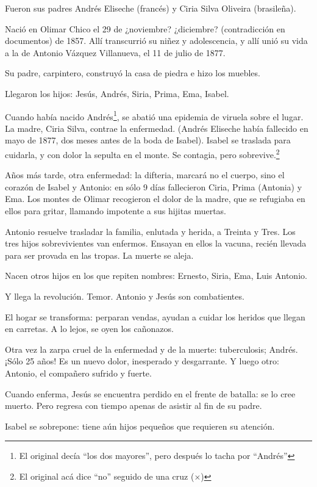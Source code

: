 \documentclass[a4paper]{article}
\begin{document}
Fueron sus padres Andrés Eliseche (francés) y Ciria Silva Oliveira (brasileña).

Nació en Olimar Chico el 29 de ¿noviembre? ¿diciembre? (contradicción en documentos) de 1857. Allí transcurrió su niñez y adolescencia, y allí unió su vida a la de Antonio Vázquez Villanueva, el 11 de julio de 1877.

Su padre, carpintero, construyó la casa de piedra e hizo los muebles.

Llegaron los hijos: Jesús, Andrés, Siria, Prima, Ema, Isabel.

Cuando había nacido Andrés\footnote{El original decía ``los dos mayores'', pero después lo tacha por ``Andrés''}, se abatió una epidemia de viruela sobre el lugar. La madre, Ciria Silva, contrae la enfermedad. (Andrés Eliseche había fallecido en mayo de 1877, dos meses antes de la boda de Isabel). Isabel se traslada para cuidarla, y con dolor la sepulta en el monte. Se contagia, pero sobrevive.\footnote{El original acá dice ``no'' seguido de una cruz ($\times$)}

Años más tarde, otra enfermedad: la difteria, marcará no el cuerpo, sino el corazón de Isabel y Antonio: en sólo 9 días fallecieron Ciria, Prima (Antonia) y Ema. Los montes de Olimar recogieron el dolor de la madre, que se refugiaba en ellos para gritar, llamando impotente a sus hijitas muertas.

Antonio resuelve trasladar la familia, enlutada y herida, a Treinta y Tres. Los tres hijos sobrevivientes van enfermos. Ensayan en ellos la vacuna, recién llevada para ser provada en las tropas. La muerte se aleja.

Nacen otros hijos en los que repiten nombres: Ernesto, Siria, Ema, Luis Antonio.

Y llega la revolución. Temor. Antonio y Jesús son combatientes.

El hogar se transforma: perparan vendas, ayudan a cuidar los heridos que llegan en carretas. A lo lejos, se oyen los cañonazos.

Otra vez la zarpa cruel de la enfermedad y de la muerte: tuberculosis; Andrés. ¡Sólo 25 años! Es un nuevo dolor, inesperado y desgarrante. Y luego otro: Antonio, el compañero sufrido y fuerte.

Cuando enferma, Jesús se encuentra perdido en el frente de batalla: se lo cree muerto. Pero regresa con tiempo apenas de asistir al fin de su padre.

Isabel se sobrepone: tiene aún hijos pequeños que requieren su atención.
\end{document}
